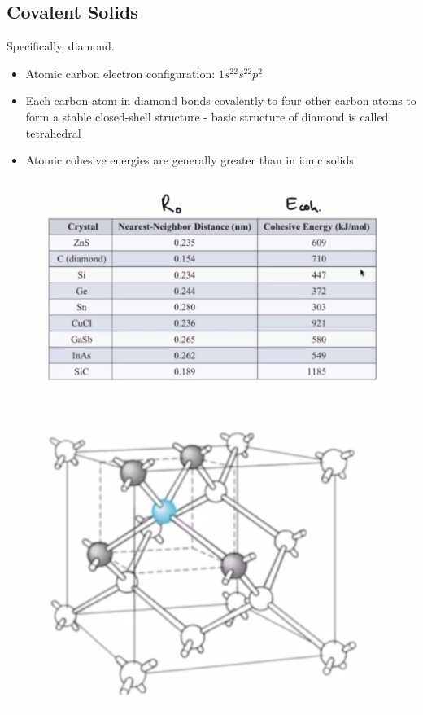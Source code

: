 \documentclass[class=article,crop=false]{standalone}
\begin{document}
\subsection{Covalent Solids}
Specifically, diamond.

\begin{itemize}
	\item Atomic carbon electron configuration: $1s^22s^22p^2$
	\item Each carbon atom in diamond bonds covalently to four other carbon atoms to form a stable closed-shell structure - basic structure of diamond is called tetrahedral
	\item Atomic cohesive energies are generally greater than in ionic solids
\end{itemize}

\begin{figure}[h!]
	\centering
	\includegraphics[width=.8\linewidth]{./Images/covalent.png}
	\caption{}
\end{figure}

\begin{figure}[h!]
	\centering
	\includegraphics[width=.8\linewidth]{./Images/tetrahedral.png}
	\caption{}
\end{figure}
\end{document}
